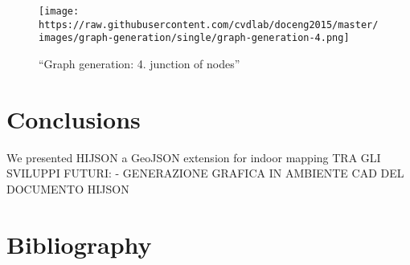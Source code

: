 \documentclass[]{article}
\begin{document}
\begin{figure}[htbp]
\centering
\texttt{[image: https://raw.githubusercontent.com/cvdlab/doceng2015/master/images/graph-generation/single/graph-generation-4.png]}
\caption{``Graph generation: 4. junction of nodes''}
\end{figure}

\section{Conclusions}\label{conclusions}

We presented HIJSON a GeoJSON extension for indoor mapping TRA GLI
SVILUPPI FUTURI: - GENERAZIONE GRAFICA IN AMBIENTE CAD DEL DOCUMENTO
HIJSON

\section{Bibliography}\label{bibliography}
\end{document}
